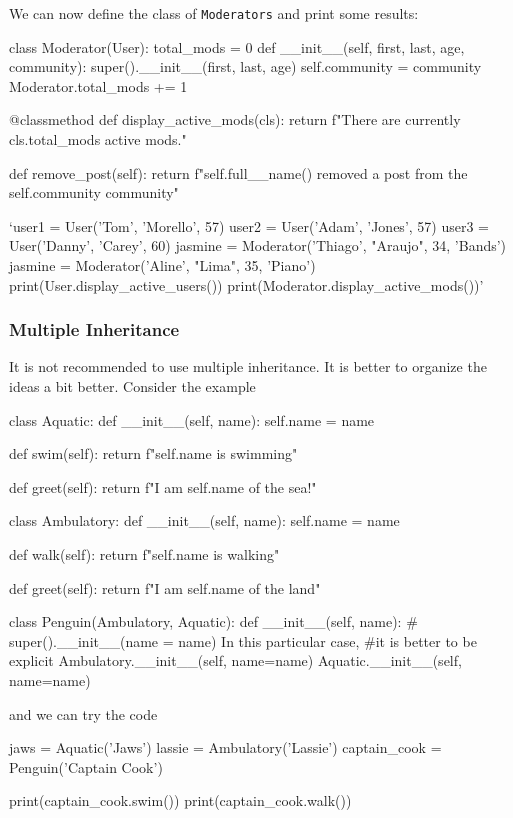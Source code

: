 We can now define the class of \verb|Moderators| and print some results:
\begin{listingcont}
class Moderator(User):
    total_mods = 0
    def __init__(self, first, last, age, community):
        super().__init__(first, last, age)
        self.community = community
        Moderator.total_mods += 1

    @classmethod
    def display_active_mods(cls):
        return f"There are currently {cls.total_mods} active mods."

    def remove_post(self):
        return f"{self.full__name()} removed a 
        post from the {self.community} community"

`user1 = User('Tom', 'Morello', 57)
user2 = User('Adam', 'Jones', 57)
user3 = User('Danny', 'Carey', 60)
jasmine = Moderator('Thiago', "Araujo", 34, 'Bands')      
jasmine = Moderator('Aline', "Lima", 35, 'Piano')      
print(User.display_active_users())
print(Moderator.display_active_mods())'  
\end{listingcont}


\subsubsection{Multiple Inheritance}

It is not recommended to use multiple inheritance. It is better to organize the ideas a bit better. Consider the example
\begin{listing}{1}
class Aquatic:
    def __init__(self, name):
        self.name = name 

    def swim(self):
        return f"{self.name} is swimming"

    def greet(self):
        return f"I am {self.name} of the sea!"        

class Ambulatory:
    def __init__(self, name):
        self.name = name 

    def walk(self):
        return f"{self.name} is walking"

    def greet(self):
        return f"I am {self.name} of the land"

class Penguin(Ambulatory, Aquatic):
    def __init__(self, name):
        # super().__init__(name = name) In this particular case, 
        #it is better to be explicit
        Ambulatory.__init__(self, name=name)
        Aquatic.__init__(self, name=name)
\end{listing}
and we can try the code 
\begin{listingcont}
jaws = Aquatic('Jaws')
lassie = Ambulatory('Lassie')
captain_cook = Penguin('Captain Cook')

print(captain_cook.swim())
print(captain_cook.walk())    
\end{listingcont}

